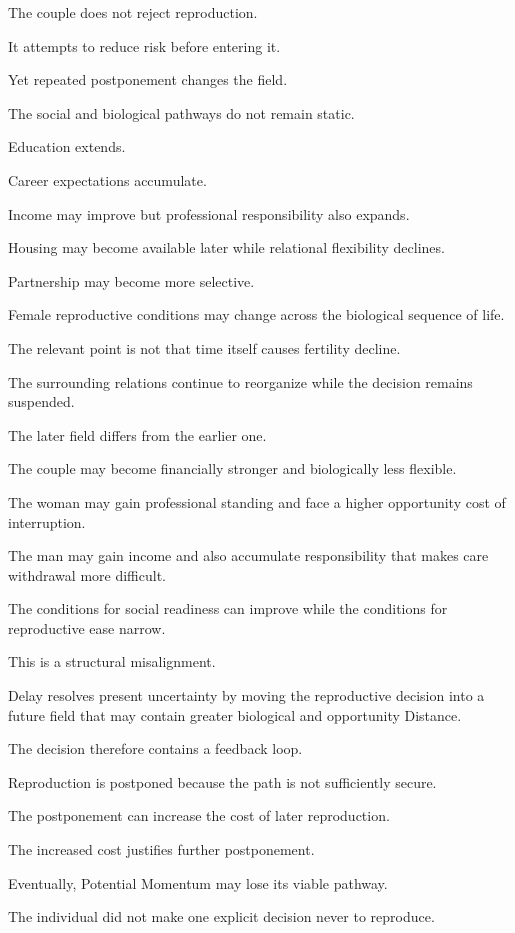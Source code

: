 The couple does not reject reproduction.

It attempts to reduce risk before entering it.

Yet repeated postponement changes the field.

The social and biological pathways do not remain static.

Education extends.

Career expectations accumulate.

Income may improve but professional responsibility also expands.

Housing may become available later while relational flexibility declines.

Partnership may become more selective.

Female reproductive conditions may change across the biological sequence of life.

The relevant point is not that time itself causes fertility decline.

The surrounding relations continue to reorganize while the decision remains suspended.

The later field differs from the earlier one.

The couple may become financially stronger and biologically less flexible.

The woman may gain professional standing and face a higher opportunity cost of interruption.

The man may gain income and also accumulate responsibility that makes care withdrawal more difficult.

The conditions for social readiness can improve while the conditions for reproductive ease narrow.

This is a structural misalignment.

Delay resolves present uncertainty by moving the reproductive decision into a future field that may contain greater biological and opportunity Distance.

The decision therefore contains a feedback loop.

Reproduction is postponed because the path is not sufficiently secure.

The postponement can increase the cost of later reproduction.

The increased cost justifies further postponement.

Eventually, Potential Momentum may lose its viable pathway.

The individual did not make one explicit decision never to reproduce.

